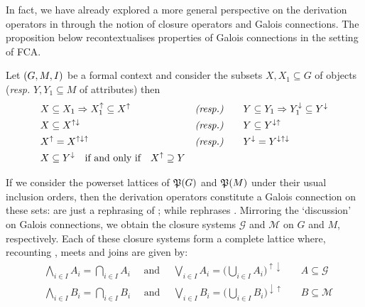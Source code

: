 In fact, we have already explored a more general perspective on the derivation operators in 
through the notion of closure operators and Galois connections. The proposition below recontextualises properties of
Galois connections in the setting of FCA.

\begin{proposition}
	\label{proposition:derivation-operators-galois} Let $(G,M,\mathrel{I})$ be a formal context and consider the subsets $X,X_{1}\subseteq
	G$ of objects (\textit{resp.} $Y,Y_{1}\subseteq M$ of attributes) then
	\begin{align}
		 & X \subseteq X_{1}\Rightarrow X_{1}^{\uparrow}\subseteq X^{\uparrow} & \textit{(\textit{resp.})} & \qquad Y \subseteq Y_{1}\Rightarrow Y_{1}^{\downarrow}\subseteq Y^{\downarrow}\label{equation:galois-1} \\
		 & X \subseteq X^{\uparrow \downarrow}                                 & \textit{(\textit{resp.})} & \qquad Y \subseteq Y^{\downarrow \uparrow}\label{equation:galois-2}                                     \\
		 & X^{\uparrow}= X^{\uparrow \downarrow \uparrow}                      & \textit{(\textit{resp.})} & \qquad Y^{\downarrow}= Y^{\downarrow \uparrow \downarrow}\label{equation:galois-3}                      \\
		 & X \subseteq Y^{\downarrow}\quad \text{if and only if}\quad X^{\uparrow}\supseteq Y             & \label{equation:galois-4}
	\end{align}
\end{proposition}

If we consider the powerset lattices of $\mathfrak{P}({G})$ and $\mathfrak{P}({M})$ under their usual inclusion orders, then the
derivation operators constitute a Galois connection on these sets: 
are just a rephrasing of ; while
 rephrases . Mirroring the `discussion' on Galois connections,
we obtain the closure systems $\mathcal{G}$ and $\mathcal{M}$ on $G$ and $M$, respectively. Each of these closure
systems form a complete lattice where, recounting , meets and joins are given by:
%
\begin{align*}
	 & \underset{i \in I}\bigwedge A_{i}= \underset{i \in I}\bigcap A_{i}\quad \text{ and }\quad \underset{i \in I}\bigvee A_{i}= \big(\underset{i \in I}\bigcup A_{i}\big)^{\uparrow \downarrow} & \quad A\subseteq \mathcal{G} \\
	 & \underset{i \in I}\bigwedge B_{i}= \underset{i \in I}\bigcap B_{i}\quad \text{ and }\quad\underset{i \in I}\bigvee B_{i}= \big( \underset{i \in I}\bigcup B_{i}\big)^{\downarrow \uparrow} & \quad B\subseteq \mathcal{M}
\end{align*}

